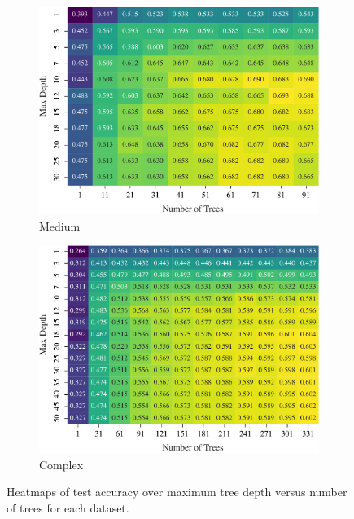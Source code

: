 \documentclass[conference]{IEEEtran}
\begin{document}
\begin{figure}[H]
  \begin{subfigure}[b]{\columnwidth}
    \includegraphics[width=\linewidth]{images/medium_depth_vs_trees_heatmap.pdf}
    \caption{Medium}
    \label{fig:exp3-medium-heatmap}
  \end{subfigure}\hfill
  \begin{subfigure}[b]{\columnwidth}
    \includegraphics[width=\linewidth]{images/complex_depth_vs_trees_heatmap.pdf}
    \caption{Complex}
    \label{fig:exp3-complex-heatmap}
  \end{subfigure}

  \caption{Heatmaps of test accuracy over maximum tree depth versus number of trees for each dataset.}
  \label{fig:exp3-depth-trees-heatmaps}
\end{figure}
\end{document}
